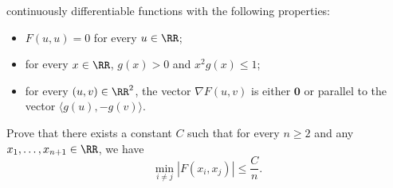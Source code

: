 continuously differentiable functions with the following properties:
\begin{itemize}
\item $F(u,u) = 0$ for every $u \in \RR$;
\item for every $x \in \RR$, $g(x) > 0$ and $x^2 g(x) \leq 1$;
\item for every $(u,v) \in \RR^2$, the vector $\nabla F(u,v)$ is either $\mathbf{0}$ or parallel to the vector $\langle g(u), -g(v) \rangle$.
\end{itemize}
Prove that there exists a constant $C$ such that for every $n\geq 2$ and any $x_1,\dots,x_{n+1} \in \RR$, we have
\[
\min_{i \neq j} |F(x_i,x_j)| \leq \frac{C}{n}.
\]
